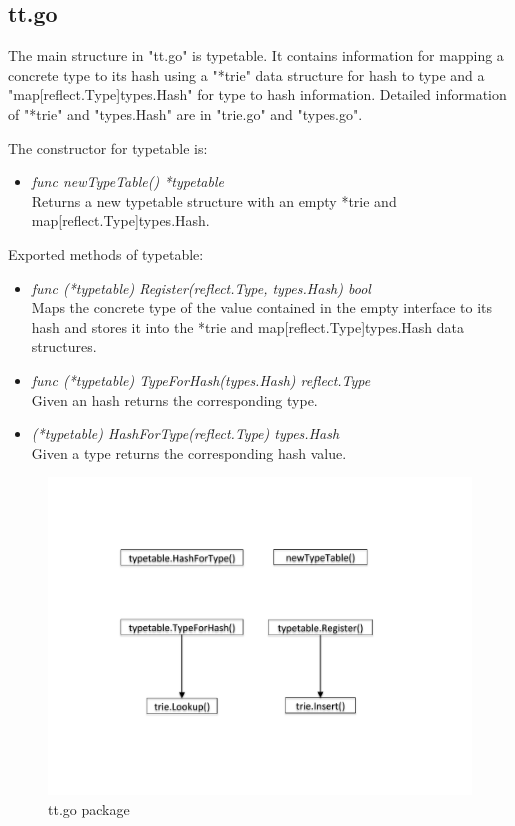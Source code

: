 \subsection{tt.go} 

The main structure in "tt.go" is typetable. It contains information for mapping a concrete type to its hash using a "*trie" data structure for hash to type and a "map[reflect.Type]types.Hash" for type to hash information. Detailed information of "*trie" and "types.Hash" are in "trie.go" and "types.go".

The constructor for typetable is:

\begin{itemize}

	\item \emph{func newTypeTable() *typetable}\\
	Returns a new typetable structure with an empty *trie and map[reflect.Type]types.Hash.
	
\end{itemize}

Exported methods of typetable:

\begin{itemize}

	\item \emph{func (*typetable) Register(reflect.Type, types.Hash) bool}\\
	Maps the concrete type of the value contained in the empty interface to its hash and stores it into the *trie and map[reflect.Type]types.Hash data structures.
	
	\item \emph{func (*typetable) TypeForHash(types.Hash) reflect.Type}\\
	Given an hash returns the corresponding type.
	
	\item \emph{(*typetable) HashForType(reflect.Type) types.Hash}\\
	Given a type returns the corresponding hash value.
	
\end{itemize}

\begin{figure}[H]
\centering
\includegraphics[scale=0.50]{ttPackage}
\caption{tt.go package}
\end{figure}